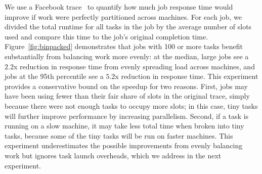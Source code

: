 We use a Facebook trace~\cite{chen2012interactive} to quantify how much job response time would
improve if work were perfectly partitioned across machines.
For each job, we divided the total runtime for all tasks in the
job by the average number of slots used and compare this time to the job's
original completion time.
Figure~\ref{fig:binpacked}
demonstrates that jobs with 100 or more tasks benefit substantially from
balancing work more evenly: at the median, large jobs see
a $2.2$x reduction in response time from evenly spreading load
across machines, and
jobs at the 95th percentile see a $5.2$x reduction in response time.
This experiment provides a conservative bound on the speedup for two reasons. First, jobs
may have been using fewer than their fair share of slots in the original trace,
simply because there were not enough tasks to occupy more slots; in this case,
tiny tasks will further improve performance by increasing parallelism. Second,
if a task is running on a slow machine, it may take less total time when
broken into tiny tasks, because some of the tiny tasks will be run on faster
machines.
This experiment underestimates the possible improvements from
evenly balancing work but ignores task launch overheads, which
we address in the next experiment.



